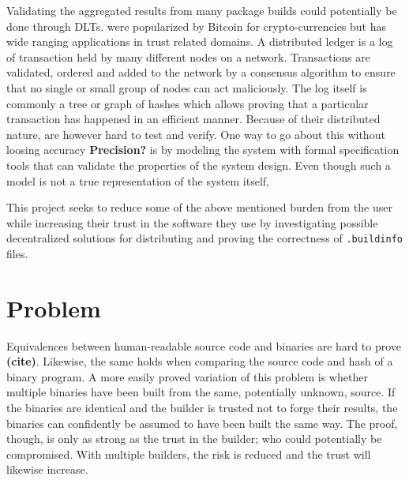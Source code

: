 \documentclass[english, biblatex, digitaloutput]{kththesis}
\begin{document}
Validating the aggregated results from many package builds could potentially be done through \glspl{DLT}.  were popularized by Bitcoin \cite{di_pierro_what_2017, nakamoto_bitcoin_nodate} for crypto-currencies but has wide ranging applications in trust related domains. A distributed ledger is a log of transaction held by many different nodes on a network. Transactions are validated, ordered and added to the network by a consensus algorithm to ensure that no single or small group of nodes can act maliciously. The log itself is commonly a tree or graph of hashes which allows proving that a particular transaction has happened in an efficient manner. Because of their distributed nature,  are however hard to test and verify. One way to go about this without loosing accuracy \textbf{Precision?} is by modeling the system with formal specification tools that can validate the properties of the system design. Even though such a model is not a true representation of the system itself,

This project seeks to reduce some of the above mentioned burden from the user while increasing their trust in the software they use by investigating possible decentralized solutions for distributing and proving the correctness of \texttt{.buildinfo} files.

\section{Problem}
\label{sec:problem}


Equivalences between human-readable source code and binaries are hard to prove \textbf{(cite)}. Likewise, the same holds when comparing the source code and hash of a binary program. A more easily proved variation of this problem is whether multiple binaries have been built from the same, potentially unknown, source. If the binaries are identical and the builder is trusted not to forge their results, the binaries can confidently be assumed to have been built the same way. The proof, though, is only as strong as the trust in the builder; who could potentially be compromised. With multiple builders, the risk is reduced and the trust will likewise increase.
\end{document}
